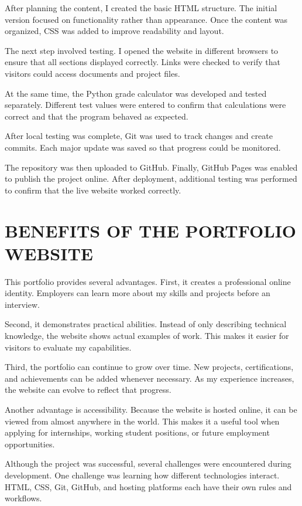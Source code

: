 \documentclass[12pt]{article}
\begin{document}
After planning the content, I created the basic HTML structure. The initial version focused on functionality rather than appearance. Once the content was organized, CSS was added to improve readability and layout.

The next step involved testing. I opened the website in different browsers to ensure that all sections displayed correctly. Links were checked to verify that visitors could access documents and project files.

At the same time, the Python grade calculator was developed and tested separately. Different test values were entered to confirm that calculations were correct and that the program behaved as expected.

After local testing was complete, Git was used to track changes and create commits. Each major update was saved so that progress could be monitored.

The repository was then uploaded to GitHub. Finally, GitHub Pages was enabled to publish the project online. After deployment, additional testing was performed to confirm that the live website worked correctly.

\section*{BENEFITS OF THE PORTFOLIO WEBSITE}
This portfolio provides several advantages. First, it creates a professional online identity. Employers can learn more about my skills and projects before an interview.

Second, it demonstrates practical abilities. Instead of only describing technical knowledge, the website shows actual examples of work. This makes it easier for visitors to evaluate my capabilities.

Third, the portfolio can continue to grow over time. New projects, certifications, and achievements can be added whenever necessary. As my experience increases, the website can evolve to reflect that progress.

Another advantage is accessibility. Because the website is hosted online, it can be viewed from almost anywhere in the world. This makes it a useful tool when applying for internships, working student positions, or future employment opportunities.

Although the project was successful, several challenges were encountered during development. One challenge was learning how different technologies interact. HTML, CSS, Git, GitHub, and hosting platforms each have their own rules and workflows.
\end{document}
